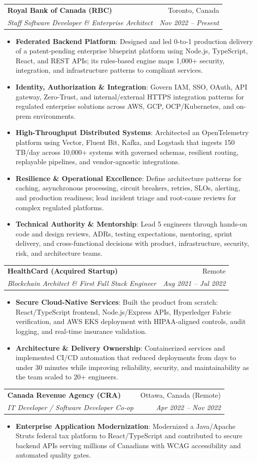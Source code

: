\documentclass[letterpaper,9.5pt]{article}
\makeatletter
\newcommand{\resumeItem}[2]{\item\small{\textbf{#1}{: #2 \vspace{-2pt}}}}
\newcommand{\resumeSubheading}[4]{\vspace{-2pt}\item\begin{tabular*}{0.97\textwidth}{l@{\extracolsep{\fill}}r}\textbf{#1} & #2 \\\textit{\small#3} & \textit{\small #4} \\\end{tabular*}\vspace{-6pt}}
\newcommand{\resumeItemListStart}{\begin{itemize}}
\newcommand{\resumeItemListEnd}{\end{itemize}\vspace{-6pt}}
\makeatother
\begin{document}
  \resumeSubheading
    {Royal Bank of Canada (RBC)}{Toronto, Canada}
    {Staff Software Developer \& Enterprise Architect}{Nov 2022 -- Present}
  \resumeItemListStart
    \resumeItem{Federated Backend Platform}
      {Designed and led 0-to-1 production delivery of a patent-pending enterprise blueprint platform using Node.js, TypeScript, React, and REST APIs; its rules-based engine maps 1,000+ security, integration, and infrastructure patterns to compliant services.}
    \resumeItem{Identity, Authorization \& Integration}
      {Govern IAM, SSO, OAuth, API gateway, Zero-Trust, and internal/external HTTPS integration patterns for regulated enterprise solutions across AWS, GCP, OCP/Kubernetes, and on-prem environments.}
    \resumeItem{High-Throughput Distributed Systems}
      {Architected an OpenTelemetry platform using Vector, Fluent Bit, Kafka, and Logstash that ingests 150\,TB/day across 10,000+ systems with governed schemas, resilient routing, replayable pipelines, and vendor-agnostic integrations.}
    \resumeItem{Resilience \& Operational Excellence}
      {Define architecture patterns for caching, asynchronous processing, circuit breakers, retries, SLOs, alerting, and production readiness; lead incident triage and root-cause reviews for complex regulated platforms.}
    \resumeItem{Technical Authority \& Mentorship}
      {Lead 5 engineers through hands-on code and design reviews, ADRs, testing expectations, mentoring, sprint delivery, and cross-functional decisions with product, infrastructure, security, risk, and architecture teams.}
  \resumeItemListEnd

  \resumeSubheading
    {HealthCard (Acquired Startup)}{Remote}
    {Blockchain Architect \& First Full Stack Engineer}{Aug 2021 -- Jul 2022}
  \resumeItemListStart
    \resumeItem{Secure Cloud-Native Services}
      {Built the product from scratch: React/TypeScript frontend, Node.js/Express APIs, Hyperledger Fabric verification, and AWS EKS deployment with HIPAA-aligned controls, audit logging, and real-time insurance validation.}
    \resumeItem{Architecture \& Delivery Ownership}
      {Containerized services and implemented CI/CD automation that reduced deployments from days to under 30 minutes while improving reliability, security, and maintainability as the team scaled to 20+ engineers.}
  \resumeItemListEnd

  \resumeSubheading
    {Canada Revenue Agency (CRA)}{Ottawa, Canada (Remote)}
    {IT Developer / Software Developer Co-op}{Apr 2022 -- Nov 2022}
  \resumeItemListStart
    \resumeItem{Enterprise Application Modernization}
      {Modernized a Java/Apache Struts federal tax platform to React/TypeScript and contributed to secure backend APIs serving millions of Canadians with WCAG accessibility and automated quality gates.}
  \resumeItemListEnd
\end{document}
